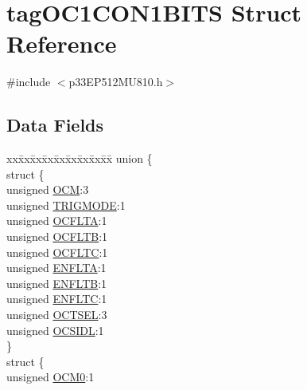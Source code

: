 \hypertarget{structtag_o_c1_c_o_n1_b_i_t_s}{}\section{tag\+O\+C1\+C\+O\+N1\+B\+I\+TS Struct Reference}
\label{structtag_o_c1_c_o_n1_b_i_t_s}


{\ttfamily \#include $<$p33\+E\+P512\+M\+U810.\+h$>$}

\subsection*{Data Fields}
\begin{DoxyCompactItemize}
\item 
\begin{tabbing}
xx\=xx\=xx\=xx\=xx\=xx\=xx\=xx\=xx\=\kill
union \{\\
\>struct \{\\
\>\>unsigned \hyperlink{structtag_o_c1_c_o_n1_b_i_t_s_a778fa0cf51a9477ac4e82d71a8733801}{OCM}:3\\
\>\>unsigned \hyperlink{structtag_o_c1_c_o_n1_b_i_t_s_a7a0057e0dca6e2663584b5b9e1da04c3}{TRIGMODE}:1\\
\>\>unsigned \hyperlink{structtag_o_c1_c_o_n1_b_i_t_s_acc967e41cecdeedc6ad4422f9ef1a6a3}{OCFLTA}:1\\
\>\>unsigned \hyperlink{structtag_o_c1_c_o_n1_b_i_t_s_a1fb30bb4421ef7c4bd0c66c379875593}{OCFLTB}:1\\
\>\>unsigned \hyperlink{structtag_o_c1_c_o_n1_b_i_t_s_a69a1772a4144abd579d17d28445b9934}{OCFLTC}:1\\
\>\>unsigned \hyperlink{structtag_o_c1_c_o_n1_b_i_t_s_a1e0f05fb23d516e003e4713fe8c1498a}{ENFLTA}:1\\
\>\>unsigned \hyperlink{structtag_o_c1_c_o_n1_b_i_t_s_a9d7aa97d5328b8b81ab7fd9145dfa0fc}{ENFLTB}:1\\
\>\>unsigned \hyperlink{structtag_o_c1_c_o_n1_b_i_t_s_a0b6f25c0f83f33b5501b6a2e6141a6ef}{ENFLTC}:1\\
\>\>unsigned \hyperlink{structtag_o_c1_c_o_n1_b_i_t_s_ae37d2a41dae2d2af1d82f7caae33cadb}{OCTSEL}:3\\
\>\>unsigned \hyperlink{structtag_o_c1_c_o_n1_b_i_t_s_afd05f4f249db4ef69b684e2f3fa6b703}{OCSIDL}:1\\
\>\} \\
\>struct \{\\
\>\>unsigned \hyperlink{structtag_o_c1_c_o_n1_b_i_t_s_a9271e84c9759ff10a7bc1cee3276e8f6}{OCM0}:1\\

\end{tabbing}
\end{DoxyCompactItemize}
